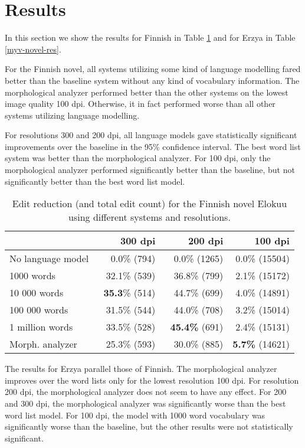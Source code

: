 \documentclass[b5paper]{article}
\begin{document}
\section{Results}
\label{res}
In this section we show the results for Finnish in Table
\ref{fin-novel-res} and for Erzya in Table
\ref{myv-novel-res}. 

For the Finnish novel, all systems utilizing some kind of language
modelling fared better than the baseline system without any kind of
vocabulary information. The morphological analyzer performed better
than the other systems on the lowest image quality 100 dpi. Otherwise,
it in fact performed worse than all other systems utilizing language
modelling.

For resolutions 300 and 200 dpi, all language models gave
statistically significant improvements over the baseline in the 95\%
confidence interval. The best word list system was better than the
morphological analyzer. For 100 dpi, only the morphological analyzer
performed significantly better than the baseline, but not
significantly better than the best word list model.

\begin{table}[!htb]
\begin{center}
\begin{tabular}{lrrr}
\hline 
                  & 300 dpi & 200 dpi & 100 dpi \\
\hline 
No language model & ~0.0\% (794)          & ~0.0\% (1265)          & 0.0\% (15504)  \\
1000 words        & ~32.1\% (539)  & ~36.8\% (799)        & 2.1\% (15172)           \\
10 000 words      & {\bf ~35.3}\% (514)  & ~44.7\%  (699)  & 4.0\% (14891)          \\
100 000 words     & ~31.5\% (544)   & ~44.0\%  (708)  & 3.2\%  (15014)              \\
1 million words   & ~33.5\% (528)   & {\bf ~45.4\%} (691)  & 2.4\% (15131)          \\
Morph. analyzer   & ~25.3\% (593)    & ~30.0\% (885)     & {\bf 5.7\%} (14621)      \\
\hline 
\end{tabular}
\caption{Edit reduction (and total edit count) for the Finnish novel Elokuu using different systems and resolutions.}\label{fin-novel-res}
\end{center}
\end{table}

The results for Erzya parallel those of Finnish. The morphological
analyzer improves over the word lists only for the lowest resolution
100 dpi. For resolution 200 dpi, the morphological analyzer does not
seem to have any effect. For 200 and 300 dpi, the morphological
analyzer was significantly worse than the best word list model. For
100 dpi, the model with 1000 word vocabulary was significantly worse
than the baseline, but the other results were not statistically
significant.
\end{document}
